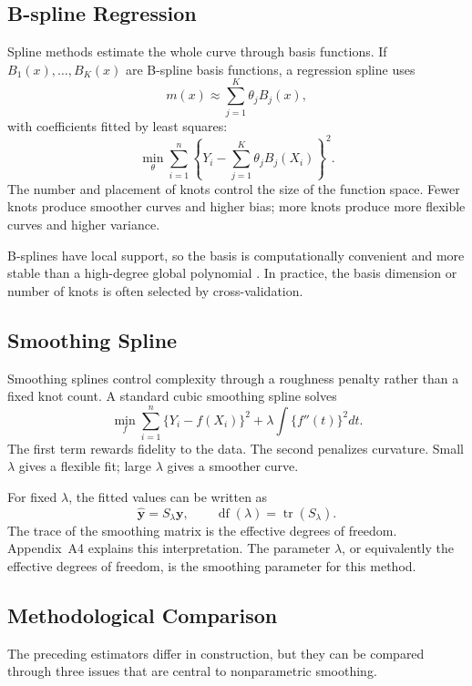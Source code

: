 \documentclass[12pt,a4paper]{article}
\begin{document}
\subsection{B-spline Regression}

Spline methods estimate the whole curve through basis functions. If \(B_1(x),\ldots,B_K(x)\) are B-spline basis functions, a regression spline uses
\[
m(x)\approx \sum_{j=1}^{K}\theta_jB_j(x),
\]
with coefficients fitted by least squares:
\[
\min_{\theta}
\sum_{i=1}^{n}\left\{Y_i-\sum_{j=1}^{K}\theta_jB_j(X_i)\right\}^2.
\]
The number and placement of knots control the size of the function space. Fewer knots produce smoother curves and higher bias; more knots produce more flexible curves and higher variance.

B-splines have local support, so the basis is computationally convenient and more stable than a high-degree global polynomial \citep{deboor2001practical}. In practice, the basis dimension or number of knots is often selected by cross-validation.

\subsection{Smoothing Spline}

Smoothing splines control complexity through a roughness penalty rather than a fixed knot count. A standard cubic smoothing spline solves
\[
\min_f
\sum_{i=1}^{n}\{Y_i-f(X_i)\}^2
+\lambda\int\{f''(t)\}^2dt.
\]
The first term rewards fidelity to the data. The second penalizes curvature. Small \(\lambda\) gives a flexible fit; large \(\lambda\) gives a smoother curve.

For fixed \(\lambda\), the fitted values can be written as
\[
\hat{\mathbf y}=S_\lambda\mathbf y,
\qquad
\operatorname{df}(\lambda)=\operatorname{tr}(S_\lambda).
\]
The trace of the smoothing matrix is the effective degrees of freedom. Appendix~A4 explains this interpretation. The parameter \(\lambda\), or equivalently the effective degrees of freedom, is the smoothing parameter for this method.

\subsection{Methodological Comparison}
\label{sec:comparison}

The preceding estimators differ in construction, but they can be compared through three issues that are central to nonparametric smoothing.
\end{document}
